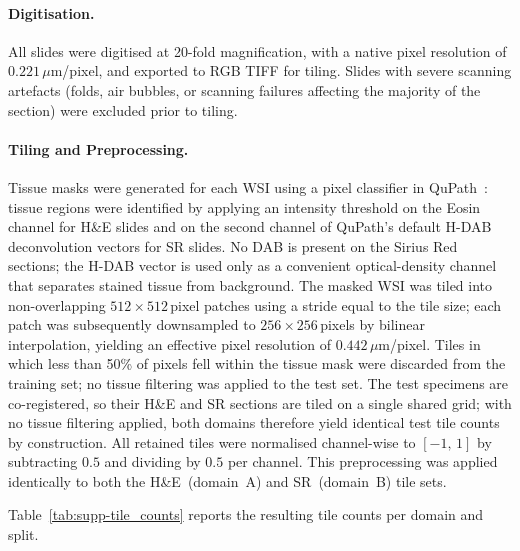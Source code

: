 \paragraph{Digitisation.}
\label{sec:supp-wsi_acquisition}

All slides were digitised at 20-fold magnification, with a native pixel resolution
of $0.221\,\mu$m/pixel, and exported to RGB TIFF for tiling. Slides with severe
scanning artefacts (folds, air bubbles, or scanning failures affecting the majority
of the section) were excluded prior to tiling.

\paragraph{Tiling and Preprocessing.}
\label{sec:supp-dataset_tiling}

Tissue masks were generated for each WSI using a pixel classifier in
QuPath~\cite{bankhead2017qupath}: tissue regions were identified by applying an
intensity threshold on the Eosin channel for H\&E slides and on the second channel
of QuPath's default H-DAB deconvolution vectors for SR slides.
No DAB is present on the Sirius Red sections; the H-DAB vector is used only as a
convenient optical-density channel that separates stained tissue from background.
The masked WSI was tiled into non-overlapping $512{\times}512$\,pixel patches
using a stride equal to the tile size; each patch was subsequently downsampled to
$256{\times}256$\,pixels by bilinear interpolation, yielding an effective pixel
resolution of $0.442\,\mu$m/pixel.
Tiles in which less than 50\% of pixels fell within the tissue mask were discarded
from the training set; no tissue filtering was applied to the test set.
The test specimens are co-registered, so their H\&E and SR sections are tiled on a
single shared grid; with no tissue filtering applied, both domains therefore yield
identical test tile counts by construction.
All retained tiles were normalised channel-wise to $[-1,\,1]$ by subtracting
$0.5$ and dividing by $0.5$ per channel.
This preprocessing was applied identically to both the H\&E~(domain~A) and
SR~(domain~B) tile sets.

Table~\ref{tab:supp-tile_counts} reports the resulting tile counts per domain and split.

